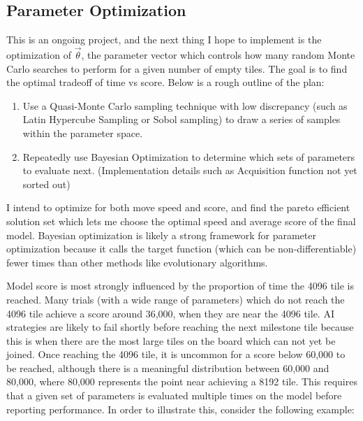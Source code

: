 \documentclass{article}
\begin{document}
\subsection{Parameter Optimization}

This is an ongoing project, and the next thing I hope to implement is the optimization of $\vec{\theta}$, the parameter vector which controls how many random Monte Carlo searches to perform for a given number of empty tiles.  The goal is to find the optimal tradeoff of time vs score.  Below is a rough outline of the plan:
\begin{enumerate}
	\item Use a Quasi-Monte Carlo sampling technique with low discrepancy (such as Latin Hypercube Sampling or Sobol sampling) to draw a series of samples within the parameter space.
	\item Repeatedly use Bayesian Optimization to determine which sets of parameters to evaluate next. (Implementation details such as Acquisition function not yet sorted out)
\end{enumerate}

I intend to optimize for both move speed and score, and find the pareto efficient solution set which lets me choose the optimal speed and average score of the final model.   Bayesian optimization is likely a strong framework for parameter optimization because it calls the target function (which can be non-differentiable) fewer times than other methods like evolutionary algorithms.

Model score is most strongly influenced by the proportion of time the 4096 tile is reached.  Many trials (with a wide range of parameters) which do not reach the 4096 tile achieve a score around 36,000, when they are near the 4096 tile.  AI strategies are likely to fail shortly before reaching the next milestone tile because this is when there are the most large tiles on the board which can not yet be joined.  Once reaching the 4096 tile, it is uncommon for a score below 60,000 to be reached, although there is a meaningful distribution between 60,000 and 80,000, where 80,000 represents the point near achieving a 8192 tile.   This requires that a given set of parameters is evaluated multiple times on the model before reporting performance.  In order to illustrate this, consider the following example:
\end{document}
